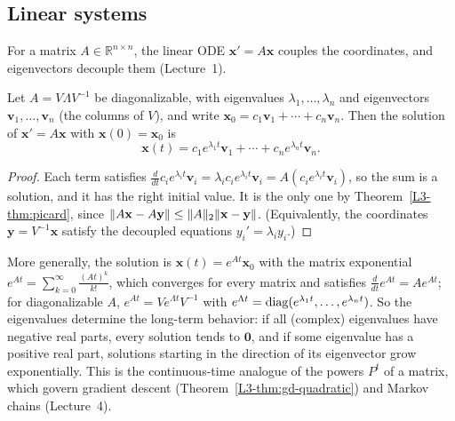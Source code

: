 \subsection{Linear systems}\label{L3-sec:linear-ode}

For a matrix $A \in \mathbb{R}^{n \times n}$, the linear ODE $\mathbf{x}' = A\mathbf{x}$ couples the coordinates, and eigenvectors decouple them (Lecture~1).

\begin{proposition}\label{L3-prop:linear-ode}
    Let $A = V\Lambda V^{-1}$ be diagonalizable, with eigenvalues $\lambda_1, \ldots, \lambda_n$ and eigenvectors $\mathbf{v}_1, \ldots, \mathbf{v}_n$ (the columns of $V$), and write $\mathbf{x}_0 = c_1\mathbf{v}_1 + \cdots + c_n\mathbf{v}_n$. Then the solution of $\mathbf{x}' = A\mathbf{x}$ with $\mathbf{x}(0) = \mathbf{x}_0$ is
    \[\mathbf{x}(t) = c_1e^{\lambda_1 t}\mathbf{v}_1 + \cdots + c_ne^{\lambda_n t}\mathbf{v}_n.\]
\end{proposition}

\begin{proof}
    Each term satisfies $\frac{d}{dt}c_ie^{\lambda_i t}\mathbf{v}_i = \lambda_ic_ie^{\lambda_i t}\mathbf{v}_i = A(c_ie^{\lambda_i t}\mathbf{v}_i)$, so the sum is a solution, and it has the right initial value. It is the only one by Theorem~\ref{L3-thm:picard}, since $\lVert A\mathbf{x} - A\mathbf{y} \rVert \leq \lVert A \rVert_2\lVert \mathbf{x} - \mathbf{y} \rVert$. (Equivalently, the coordinates $\mathbf{y} = V^{-1}\mathbf{x}$ satisfy the decoupled equations $y_i' = \lambda_i y_i$.)
\end{proof}

More generally, the solution is $\mathbf{x}(t) = e^{At}\mathbf{x}_0$ with the matrix exponential $e^{At} = \sum_{k=0}^\infty \frac{(At)^k}{k!}$, which converges for every matrix and satisfies $\frac{d}{dt}e^{At} = Ae^{At}$; for diagonalizable $A$, $e^{At} = Ve^{\Lambda t}V^{-1}$ with $e^{\Lambda t} = \operatorname{diag}(e^{\lambda_1 t}, \ldots, e^{\lambda_n t})$. So the eigenvalues determine the long-term behavior: if all (complex) eigenvalues have negative real parts, every solution tends to $\mathbf{0}$, and if some eigenvalue has a positive real part, solutions starting in the direction of its eigenvector grow exponentially. This is the continuous-time analogue of the powers $P^t$ of a matrix, which govern gradient descent (Theorem~\ref{L3-thm:gd-quadratic}) and Markov chains (Lecture~4).

